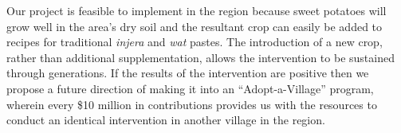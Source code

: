 \documentclass[12pt, letterpaper, draft]{article}
\begin{document}
Our project is feasible to implement in the region because sweet potatoes will grow well in the area's dry soil and the resultant crop can easily be added to recipes for traditional \emph{injera} and \emph{wat} pastes. The introduction of a new crop, rather than additional supplementation, allows the intervention to be sustained through generations. If the results of the intervention are positive then we propose a future direction of making it into an ``Adopt-a-Village'' program, wherein every \$10 million in contributions provides us with the resources to conduct an identical intervention in another village in the region.
\end{document}
